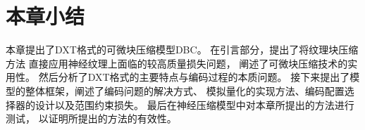 \section{本章小结}

本章提出了DXT格式的可微块压缩模型DBC。
在引言部分，提出了将纹理块压缩方法
直接应用神经纹理上面临的较高质量损失问题，
阐述了可微块压缩技术的实用性。
然后分析了DXT格式的主要特点与编码过程的本质问题。
接下来提出了模型的整体框架，阐述了编码问题的解决方式、
模拟量化的实现方法、编码配置选择器的设计以及范围约束损失。
最后在神经压缩模型中对本章所提出的方法进行测试，
以证明所提出的方法的有效性。











